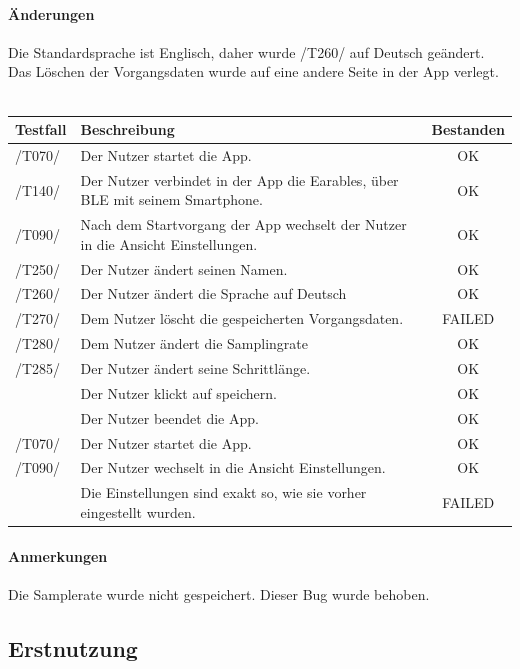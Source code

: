 \documentclass[a4paper,12pt]{article}
\newcommand{\testok}[0]{
	\cellcolor{green!25} OK
}
\newcommand{\testfailed}[0]{
	\cellcolor{red!25} FAILED
}
\begin{document}
\paragraph{Änderungen}
Die Standardsprache ist Englisch, daher wurde /T260/ auf Deutsch geändert.\\
Das Löschen der Vorgangsdaten wurde auf eine andere Seite in der App verlegt.
\\
\\
\begin{tabular}{ |p{1.5cm} | p{12cm} | c| }
	\hline
	\textbf{Testfall} & \textbf{Beschreibung} & \textbf{Bestanden}\\
	\hline
	/T070/ & Der Nutzer startet die App. & \testok \\
	\hline
	/T140/ & Der Nutzer verbindet in der App die Earables, über BLE mit seinem Smartphone. & \testok  \\
	\hline
	/T090/ & Nach dem Startvorgang der App wechselt der Nutzer in die Ansicht \glqq Einstellungen\grqq . & \testok \\
	\hline
	/T250/ & Der Nutzer ändert seinen Namen. & \testok  \\
	\hline
	/T260/ & Der Nutzer ändert die Sprache auf Deutsch & \testok  \\
	\hline
	/T270/ & Dem Nutzer löscht die gespeicherten Vorgangsdaten. & \testfailed  \\
	\hline
	/T280/ & Dem Nutzer ändert die Samplingrate & \testok  \\
	\hline
	/T285/ & Der Nutzer ändert seine Schrittlänge. & \testok  \\
	\hline
	& Der Nutzer klickt auf speichern. & \testok  \\
	\hline
	& Der Nutzer beendet die App. & \testok  \\
	\hline
	/T070/ & Der Nutzer startet die App. & \testok  \\
	\hline
	/T090/ & Der Nutzer wechselt in die Ansicht \glqq Einstellungen\grqq . & \testok  \\
	\hline
	& Die Einstellungen sind exakt so, wie sie vorher eingestellt wurden. & \testfailed  \\
	\hline
\end{tabular}
\paragraph{Anmerkungen}
Die Samplerate wurde nicht gespeichert. Dieser Bug wurde behoben.

\subsection{Erstnutzung}
\end{document}
